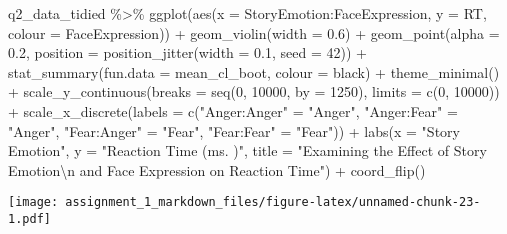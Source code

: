 \documentclass[
]{article}
\newenvironment{Shaded}{\begin{snugshade}}{\end{snugshade}}
\newcommand{\AttributeTok}[1]{\textcolor[rgb]{0.77,0.63,0.00}{#1}}
\newcommand{\DecValTok}[1]{\textcolor[rgb]{0.00,0.00,0.81}{#1}}
\newcommand{\FloatTok}[1]{\textcolor[rgb]{0.00,0.00,0.81}{#1}}
\newcommand{\FunctionTok}[1]{\textcolor[rgb]{0.00,0.00,0.00}{#1}}
\newcommand{\NormalTok}[1]{#1}
\newcommand{\OtherTok}[1]{\textcolor[rgb]{0.56,0.35,0.01}{#1}}
\newcommand{\SpecialCharTok}[1]{\textcolor[rgb]{0.00,0.00,0.00}{#1}}
\newcommand{\StringTok}[1]{\textcolor[rgb]{0.31,0.60,0.02}{#1}}
\begin{document}
\begin{Shaded}
\begin{Highlighting}[]
\NormalTok{q2\_data\_tidied }\SpecialCharTok{\%\textgreater{}\%} 
  \FunctionTok{ggplot}\NormalTok{(}\FunctionTok{aes}\NormalTok{(}\AttributeTok{x =}\NormalTok{ StoryEmotion}\SpecialCharTok{:}\NormalTok{FaceExpression, }\AttributeTok{y =}\NormalTok{ RT, }\AttributeTok{colour =}\NormalTok{ FaceExpression)) }\SpecialCharTok{+}
  \FunctionTok{geom\_violin}\NormalTok{(}\AttributeTok{width =} \FloatTok{0.6}\NormalTok{) }\SpecialCharTok{+}
  \FunctionTok{geom\_point}\NormalTok{(}\AttributeTok{alpha =} \FloatTok{0.2}\NormalTok{, }\AttributeTok{position =} \FunctionTok{position\_jitter}\NormalTok{(}\AttributeTok{width =} \FloatTok{0.1}\NormalTok{, }\AttributeTok{seed =} \DecValTok{42}\NormalTok{)) }\SpecialCharTok{+}
  \FunctionTok{stat\_summary}\NormalTok{(}\AttributeTok{fun.data =} \StringTok{\textquotesingle{}mean\_cl\_boot\textquotesingle{}}\NormalTok{, }\AttributeTok{colour =} \StringTok{\textquotesingle{}black\textquotesingle{}}\NormalTok{) }\SpecialCharTok{+}
  \FunctionTok{theme\_minimal}\NormalTok{() }\SpecialCharTok{+}
  \FunctionTok{scale\_y\_continuous}\NormalTok{(}\AttributeTok{breaks =} \FunctionTok{seq}\NormalTok{(}\DecValTok{0}\NormalTok{, }\DecValTok{10000}\NormalTok{, }\AttributeTok{by =} \DecValTok{1250}\NormalTok{),}
                     \AttributeTok{limits =} \FunctionTok{c}\NormalTok{(}\DecValTok{0}\NormalTok{, }\DecValTok{10000}\NormalTok{)) }\SpecialCharTok{+}
  \FunctionTok{scale\_x\_discrete}\NormalTok{(}\AttributeTok{labels =} \FunctionTok{c}\NormalTok{(}\StringTok{"Anger:Anger"} \OtherTok{=} \StringTok{"Anger"}\NormalTok{,}
                              \StringTok{"Anger:Fear"} \OtherTok{=} \StringTok{"Anger"}\NormalTok{,}
                              \StringTok{"Fear:Anger"} \OtherTok{=} \StringTok{"Fear"}\NormalTok{,}
                              \StringTok{"Fear:Fear"} \OtherTok{=} \StringTok{"Fear"}\NormalTok{)) }\SpecialCharTok{+}
  \FunctionTok{labs}\NormalTok{(}\AttributeTok{x =} \StringTok{"Story Emotion"}\NormalTok{,}
       \AttributeTok{y =} \StringTok{"Reaction Time (ms. )"}\NormalTok{,}
       \AttributeTok{title =} \StringTok{"Examining the Effect of Story Emotion}\SpecialCharTok{\textbackslash{}n}\StringTok{ and Face Expression on Reaction Time"}\NormalTok{) }\SpecialCharTok{+}
  \FunctionTok{coord\_flip}\NormalTok{()}
\end{Highlighting}
\end{Shaded}

\texttt{[image: assignment\_1\_markdown\_files/figure-latex/unnamed-chunk-23-1.pdf]}
\end{document}

